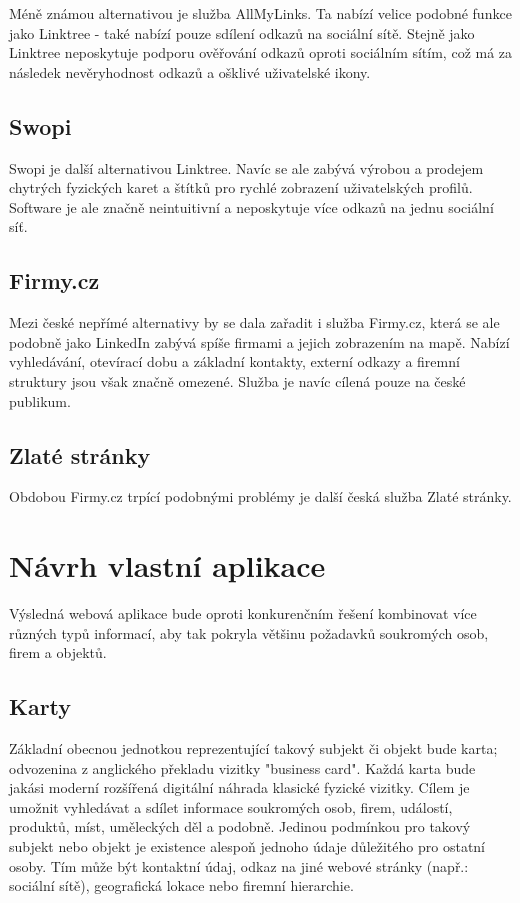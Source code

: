 	Méně známou alternativou je služba AllMyLinks.
	Ta nabízí velice podobné funkce jako Linktree - také nabízí pouze sdílení odkazů na sociální sítě.
	Stejně jako Linktree neposkytuje podporu ověřování odkazů oproti sociálním sítím, což má za následek
	nevěryhodnost odkazů a ošklivé uživatelské ikony.

	\subsection{Swopi}

	Swopi je další alternativou Linktree.
	Navíc se ale zabývá výrobou a prodejem chytrých fyzických karet a štítků pro rychlé zobrazení uživatelských profilů.
	Software je ale značně neintuitivní a neposkytuje více odkazů na jednu sociální síť.

	\subsection{Firmy.cz}

	Mezi české nepřímé alternativy by se dala zařadit i služba Firmy.cz, která se ale podobně jako LinkedIn zabývá
	spíše firmami a jejich zobrazením na mapě.
	Nabízí vyhledávání, otevírací dobu a základní kontakty, externí odkazy a firemní struktury jsou však značně omezené.
	Služba je navíc cílená pouze na české publikum.

	\subsection{Zlaté stránky}

	Obdobou Firmy.cz trpící podobnými problémy je další česká služba Zlaté stránky.

\section{Návrh vlastní aplikace}

Výsledná webová aplikace bude oproti konkurenčním řešení kombinovat více různých typů informací, aby tak pokryla
většinu požadavků soukromých osob, firem a objektů.

	\subsection{Karty}

	Základní obecnou jednotkou reprezentující takový subjekt či objekt bude karta; odvozenina z anglického překladu vizitky "business card".
	Každá karta bude jakási moderní rozšířená digitální náhrada klasické fyzické vizitky.
	Cílem je umožnit vyhledávat a sdílet informace soukromých osob, firem, událostí, produktů, míst, uměleckých děl a podobně.
	Jedinou podmínkou pro takový subjekt nebo objekt je existence alespoň jednoho údaje důležitého pro ostatní osoby.
	Tím může být kontaktní údaj, odkaz na jiné webové stránky (např.: sociální sítě), geografická lokace nebo
	firemní hierarchie.

